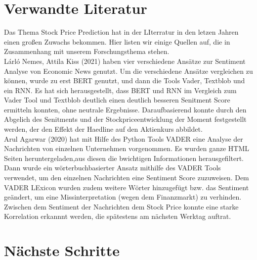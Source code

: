 \section*{Verwandte Literatur}
Das Thema Stock Price Prediction hat in der LIterratur in den letzen Jahren einen großen Zuwachs bekommen. Hier listen wir einige Quellen auf, die in Zusammenhang mit unserem Forschungsthema stehen.\\
Lárló Nemes, Attila Kiss (2021) haben vier verschiedene Ansätze zur Sentiment Analyse von Economic News genutzt. Um die verschiedene Ansätze vergleichen zu können, wurde zu erst BERT genutzt, und dann die Tools Vader, Textblob und ein RNN. Es hat sich herausgestellt, dass BERT und RNN im Vergleich zum Vader Tool und Textblob deutlich einen deutlich besseren Senitment Score ermitteln konnten, ohne neutrale Ergebnisse. Daraufbasierend konnte durch den Abgelich des Senitments und der Stockpriceentwicklung der Moment festgestellt werden, der den Effekt der Haedline auf den Aktienkurs abbildet.\\
Arul Agarwar (2020) hat mit Hilfe des Python Tools VADER eine Analyse der Nachrichten von einzelnen Unternehmen vorgenommen. Es wurden ganze HTML Seiten heruntergeladen,aus diesen die bwichtigen Informationen herausgefiltert. Dann wurde ein wörterbuchbasierter Ansatz mithilfe des VADER Tools verwendet, um den einzelnen Nachrichten eine Sentiment Score zuzuweisen. Dem VADER LExicon wurden zudem weitere Wörter hinzugefügt bzw. das Sentiment geändert, um eine Missinterpretation (wegen dem Finanzmarkt) zu verhinden. Zwischen dem Sentiment der Nachrichten dem Stock Price konnte eine starke Korrelation erkannnt werden, die spätestens am nächsten Werktag auftrat.
\section*{Nächste Schritte}
